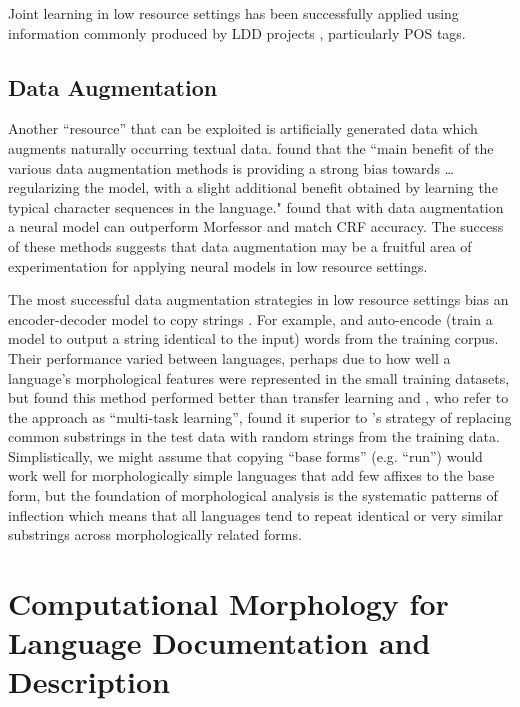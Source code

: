 \documentclass[12pt]{article}
\begin{document}
Joint learning in low resource settings has been successfully applied using information commonly produced by LDD projects \cite{palmer_semi-automated_2009,moeller_automatic_2018}, particularly POS tags.

\subsection{Data Augmentation}
\label{augment}

Another ``resource'' that can be exploited is artificially generated data which augments naturally occurring textual data.  found that the ``main benefit of the various data augmentation methods is providing a strong bias towards … regularizing the model, with a slight additional benefit obtained by learning the typical character sequences in the language."  found that with data augmentation a neural model can outperform Morfessor and match CRF accuracy. The success of these methods suggests that data augmentation may be a fruitful area of experimentation for applying neural models in low resource settings.

The most successful data augmentation strategies in low resource settings bias an encoder-decoder model to copy strings \cite{bergmanis_training_2017,kann_fortification_2018,makarov_align_2017,makarov_uzh_2018}. For example,  and  auto-encode (train a model to output a string identical to the input) words from the training corpus. Their performance varied between languages, perhaps due to how well a language’s morphological features were represented in the small training datasets, but  found this method performed better than transfer learning and , who refer to the approach as ``multi-task learning'', found it superior to 's strategy of replacing common substrings in the test data with random strings from the training data.  Simplistically, we might assume that copying ``base forms'' (e.g. ``run'') would work well for morphologically simple languages that add few affixes to the base form, but the foundation of morphological analysis is the systematic patterns of inflection which means that all languages tend to repeat identical or very similar substrings across morphologically related forms. 

\section{Computational Morphology for Language Documentation and Description}
\label{CLLDD}
\end{document}

